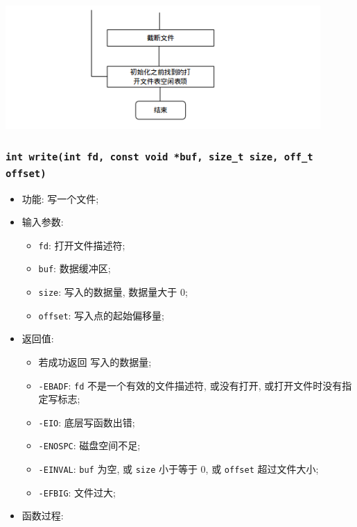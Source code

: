 \documentclass[nofonts]{ctexart}
\begin{document}
\begin{itemize}
  \includegraphics[width=12cm]{./images/./open_2.png}
  \end{itemize}
  \subsubsection[\texttt{write}]{\texttt{int write(int fd, const void *buf, size\_t size, off\_t offset)}}
  \begin{itemize}
\item
  功能: 写一个文件;
\item
  输入参数:

  \begin{itemize}
  \item
    \texttt{fd}: 打开文件描述符;
  \item
    \texttt{buf}: 数据缓冲区;
  \item
    \texttt{size}: 写入的数据量, 数据量大于 0;
  \item
    \texttt{offset}: 写入点的起始偏移量;
  \end{itemize}
\item
  返回值:

  \begin{itemize}
  \item
    若成功返回 写入的数据量;
  \item
    \texttt{-EBADF}: \texttt{fd} 不是一个有效的文件描述符, 或没有打开,
    或打开文件时没有指定写标志;
  \item
    \texttt{-EIO}: 底层写函数出错;
  \item
    \texttt{-ENOSPC}: 磁盘空间不足;
  \item
    \texttt{-EINVAL}: \texttt{buf} 为空, 或 \texttt{size} 小于等于 0, 或
    \texttt{offset} 超过文件大小;
  \item
    \texttt{-EFBIG}: 文件过大;
  \end{itemize}
\item
  函数过程:


\end{itemize}
\end{document}
